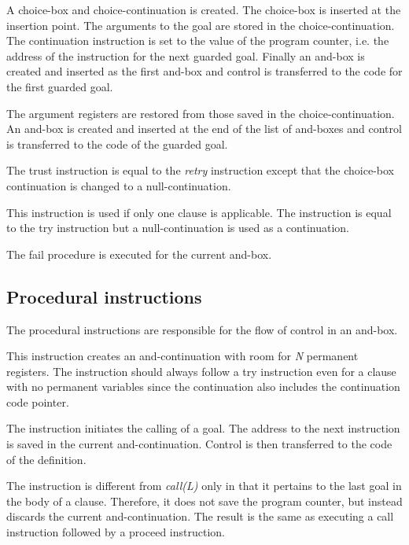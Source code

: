 A choice-box and choice-continuation is created. The choice-box is
inserted at the insertion point. The arguments to the goal are stored
in the choice-continuation.  The continuation instruction is set to
the value of the program counter, i.e. the address of the instruction for
the next guarded goal.  Finally an and-box is created and inserted as
the first and-box and control is transferred to the code for the first
guarded goal.

The argument registers are restored from those saved in the
choice-continu\-ation.  An and-box is created and inserted at the end of
the list of and-boxes and control is transferred to the code of the
guarded goal.

The trust instruction is equal to the {\em retry} instruction except that
the choice-box continuation is changed to a null-continuation.

This instruction is used if only one clause is applicable. The
instruction is equal to the try instruction but a null-continuation is
used as a continuation.

 The fail procedure is executed for the current and-box.

\subsection*{Procedural instructions}

The procedural instructions are responsible for the flow of control in 
an and-box.

This instruction creates an and-continuation with room for {\em N} permanent
registers. The instruction should always follow a try instruction even for a
clause with no permanent variables since the continuation also includes the
continuation code pointer.


The instruction initiates the calling of a goal.  The address to the
next instruction is saved in the current and-continuation. Control is
then transferred to the code of the definition.


 The instruction is different from {\em
call(L)} only in that it pertains to the last goal in the body of a
clause.  Therefore, it does not save the program counter, but instead
discards the current and-continuation. The result is the same as
executing a call instruction followed by a proceed instruction.
      
